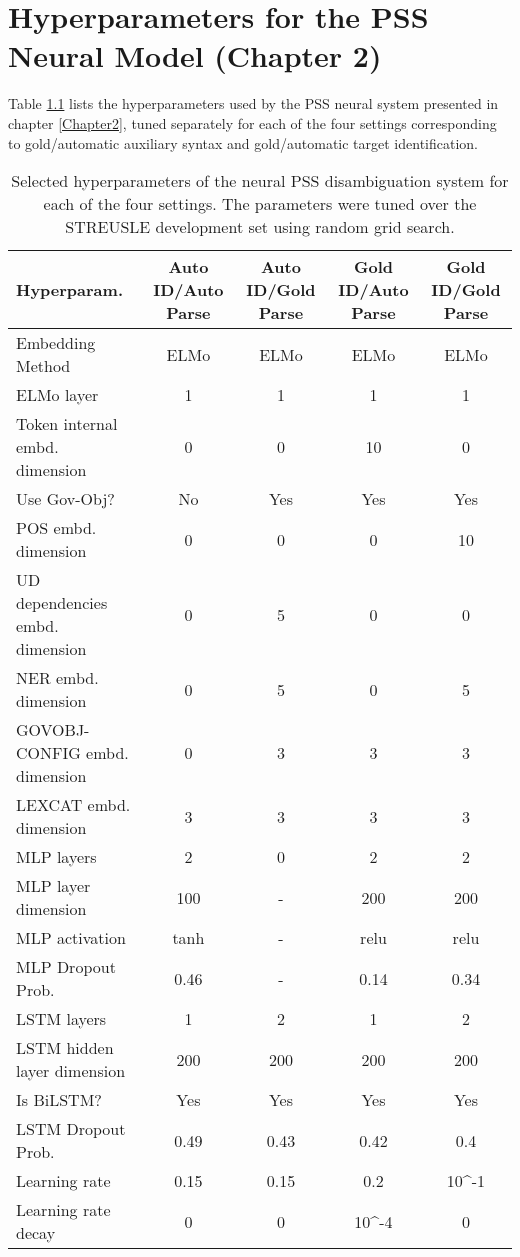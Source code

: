 
\chapter{Hyperparameters for the PSS Neural Model (Chapter 2)} %

\label{AppendixA} %

Table \ref{tab:hyperparamsA} lists the hyperparameters used by the
PSS neural system presented in chapter \ref{Chapter2}, tuned separately for each of the four settings corresponding to gold/automatic auxiliary syntax and gold/automatic target identification.

\begin{table}[]
  \small
	\centering
	\begin{tabular}{@{}l|cccc@{}}
		\toprule
		Hyperparam. & Auto ID/Auto Parse & Auto ID/Gold Parse & Gold ID/Auto Parse & Gold ID/Gold Parse\\
		\midrule
        Embedding Method & ELMo & ELMo & ELMo & ELMo \\
        ELMo layer & 1 & 1 & 1 & 1 \\
        Token internal embd. dimension & 0 & 0 & 10 & 0 \\
        Use Gov-Obj? & No & Yes & Yes & Yes \\
        POS embd. dimension  & 0 & 0 & 0 & 10 \\
        UD dependencies embd. dimension  & 0 & 5 & 0 & 0 \\
        NER  embd. dimension  & 0 & 5 & 0 & 5 \\
        GOVOBJ-CONFIG embd. dimension  & 0 & 3 & 3 & 3 \\
        LEXCAT embd. dimension  & 3 & 3 & 3 & 3 \\
        MLP layers  & 2 & 0 & 2 & 2 \\
        MLP layer dimension  & 100 & - & 200 & 200 \\
        MLP activation  & tanh & - & relu & relu \\
        MLP Dropout Prob.  & 0.46 & - & 0.14 & 0.34 \\
        LSTM layers  & 1 & 2 & 1 & 2 \\
        LSTM hidden layer dimension  & 200 & 200 & 200 & 200 \\
        Is BiLSTM? & Yes & Yes & Yes & Yes \\
        LSTM Dropout Prob.  & 0.49 & 0.43 & 0.42 & 0.4 \\
        Learning rate  & 0.15 & 0.15 & 0.2 & 10^{-1} \\
        Learning rate decay  & 0 & 0 & 10^{-4} & 0 \\
		\bottomrule
	\end{tabular}
	\caption{\label{tab:hyperparamsA}
        Selected hyperparameters of the neural PSS disambiguation system for each of the four settings. The parameters were tuned over the STREUSLE development set using random grid search.
	}

\end{table}
